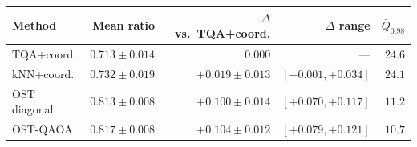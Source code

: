 \begin{tabular}{lrrrr}
\toprule
Method & Mean ratio & $\Delta$ vs.\ TQA+coord. & $\Delta$ range & $\bar{Q}_{0.98}$ \\
\midrule
TQA+coord. & $0.713\pm0.014$ & $0.000$ & --- & $24.6$ \\
kNN+coord. & $0.732\pm0.019$ & $+0.019\pm0.013$ & $[-0.001, +0.034]$ & $24.1$ \\
OST diagonal & $0.813\pm0.008$ & $+0.100\pm0.014$ & $[+0.070, +0.117]$ & $11.2$ \\
OST-QAOA & $0.817\pm0.008$ & $+0.104\pm0.012$ & $[+0.079, +0.121]$ & $10.7$ \\
\bottomrule
\end{tabular}
